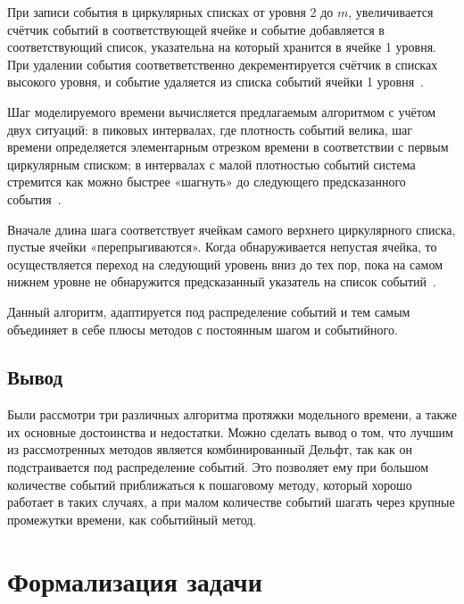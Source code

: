 При записи события в циркулярных списках от уровня 2 до $m$, увеличивается счётчик событий в соответствующей ячейке и событие добавляется в соответствующий список, указательна на который хранится в ячейке 1 уровня. При удалении события соответветственно декрементируется счётчик в списках высокого уровня, и событие удаляется из списка событий ячейки 1 уровня~\cite{delft}. 

Шаг моделируемого времени вычисляется предлагаемым алгоритмом с учётом двух ситуаций: в пиковых интервалах, где плотность событий велика, шаг времени определяется элементарным отрезком времени в  соответствии с первым циркулярным списком; в интервалах с малой плотностью событий система стремится как можно быстрее «шагнуть» до следующего предсказанного события~\cite{delft}.

Вначале длина шага соответствует ячейкам самого верхнего циркулярного списка, пустые ячейки «перепрыгиваются». Когда обнаруживается непустая ячейка, то осуществляется переход на следующий уровень вниз до тех пор, пока на самом нижнем уровне не обнаружится предсказанный указатель на список событий~\cite{delft}.

Данный алгоритм, адаптируется под распределение событий и тем самым объединяет в себе плюсы методов с постоянным шагом и событийного.

\subsection*{Вывод}

Были рассмотри три различных алгоритма протяжки модельного времени, а также их основные достоинства и недостатки. Можно сделать вывод о том, что лучшим из рассмотренных методов является комбинированный Дельфт, так как он подстраивается под распределение событий. Это позволяет ему при большом количестве событий приближаться к пошаговому методу, который хорошо работает в таких случаях, а при малом количестве событий шагать через крупные промежутки времени, как событийный метод.


\section{Формализация задачи}
